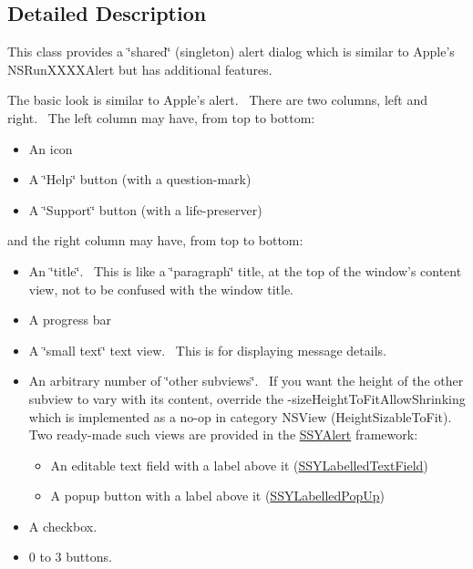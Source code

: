 \subsection{Detailed Description}
This class provides a \char`\"{}shared\char`\"{} (singleton) alert dialog which is similar to Apple's NSRunXXXXAlert but has additional features. 

The basic look is similar to Apple's alert.~ There are two columns, left and right.~ The left column may have, from top to bottom: \begin{itemize}
\item An icon \item A \char`\"{}Help\char`\"{} button (with a question-mark) \item A \char`\"{}Support\char`\"{} button (with a life-preserver) \end{itemize}
and the right column may have, from top to bottom: \begin{itemize}
\item An \char`\"{}title\char`\"{}.~ This is like a \char`\"{}paragraph\char`\"{} title, at the top of the window's content view, not to be confused with the window title. \item A progress bar \item A \char`\"{}small text\char`\"{} text view.~ This is for displaying message details. \item An arbitrary number of \char`\"{}other subviews\char`\"{}.~ If you want the height of the other subview to vary with its content, override the -sizeHeightToFitAllowShrinking which is implemented as a no-op in category NSView (HeightSizableToFit).~ Two ready-made such views are provided in the \hyperlink{interface_s_s_y_alert}{SSYAlert} framework: \begin{itemize}
\item An editable text field with a label above it (\hyperlink{interface_s_s_y_labelled_text_field}{SSYLabelledTextField}) \item A popup button with a label above it (\hyperlink{interface_s_s_y_labelled_pop_up}{SSYLabelledPopUp}) \end{itemize}
\item A checkbox. \item 0 to 3 buttons. \end{itemize}


